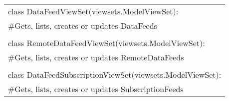 \begin{center}
\begin{tabular}{|l|}
			class DataFeedViewSet(viewsets.ModelViewSet):\\
			\#Gets, lists, creates or updates DataFeeds\\ \\
			
			class RemoteDataFeedViewSet(viewsets.ModelViewSet):\\
			\#Gets, lists, creates or updates RemoteDataFeeds\\ \\
			
			class DataFeedSubscriptionViewSet(viewsets.ModelViewSet):\\
			\#Gets, lists, creates or updates SubscriptionFeeds\\
			
			\hline
		\end{tabular}
	\end{center}
	\newpage
